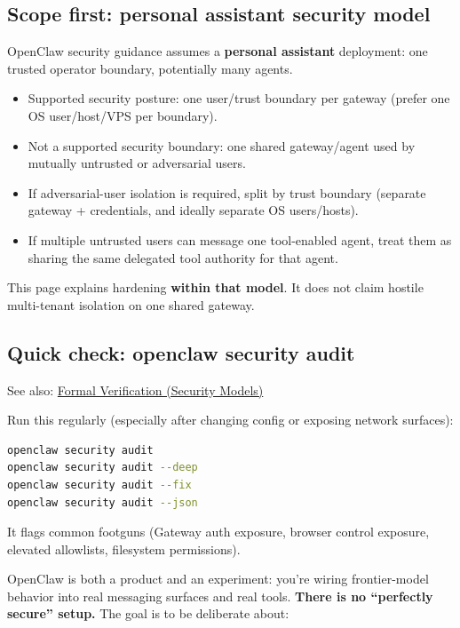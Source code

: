 \subsection{Scope first: personal assistant security model}


OpenClaw security guidance assumes a \textbf{personal assistant} deployment: one trusted operator boundary, potentially many agents.

\begin{itemize}
  \item Supported security posture: one user/trust boundary per gateway (prefer one OS user/host/VPS per boundary).
  \item Not a supported security boundary: one shared gateway/agent used by mutually untrusted or adversarial users.
  \item If adversarial-user isolation is required, split by trust boundary (separate gateway + credentials, and ideally separate OS users/hosts).
  \item If multiple untrusted users can message one tool-enabled agent, treat them as sharing the same delegated tool authority for that agent.
\end{itemize}


This page explains hardening \textbf{within that model}. It does not claim hostile multi-tenant isolation on one shared gateway.

\subsection{Quick check: openclaw security audit}


See also: \href{/security/formal-verification/}{Formal Verification (Security Models)}

Run this regularly (especially after changing config or exposing network surfaces):

\begin{lstlisting}[language=bash]
openclaw security audit
openclaw security audit --deep
openclaw security audit --fix
openclaw security audit --json
\end{lstlisting}


It flags common footguns (Gateway auth exposure, browser control exposure, elevated allowlists, filesystem permissions).

OpenClaw is both a product and an experiment: you’re wiring frontier-model behavior into real messaging surfaces and real tools. \textbf{There is no “perfectly secure” setup.} The goal is to be deliberate about:

